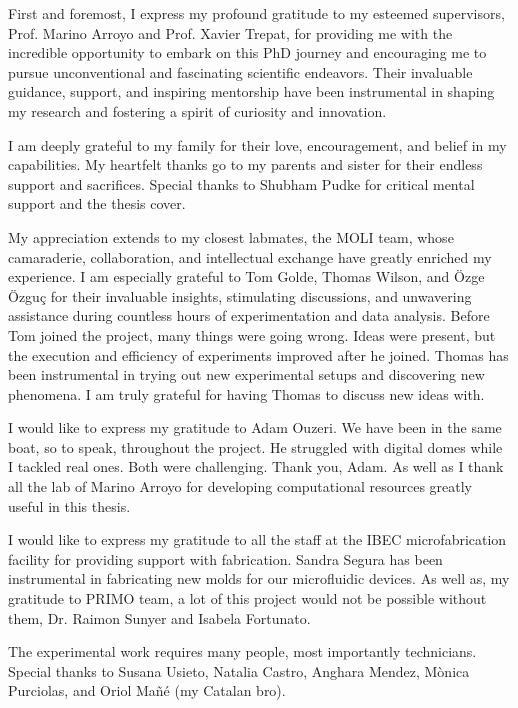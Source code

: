 \begin{Acknowledgements}
	First and foremost, I express my profound gratitude to my esteemed supervisors, Prof. Marino Arroyo and Prof. Xavier Trepat, for providing me with the incredible opportunity to embark on this PhD journey and encouraging me to pursue unconventional and fascinating scientific endeavors. Their invaluable guidance, support, and inspiring mentorship have been instrumental in shaping my research and fostering a spirit of curiosity and innovation.
	
	I am deeply grateful to my family for their love, encouragement, and belief in my capabilities. My heartfelt thanks go to my parents and sister for their endless support and sacrifices. Special thanks to Shubham Pudke for critical mental support and the thesis cover.
	
	My appreciation extends to my closest labmates, the MOLI team, whose camaraderie, collaboration, and intellectual exchange have greatly enriched my experience. I am especially grateful to Tom Golde, Thomas Wilson, and Özge Özguç for their invaluable insights, stimulating discussions, and unwavering assistance during countless hours of experimentation and data analysis. Before Tom joined the project, many things were going wrong. Ideas were present, but the execution and efficiency of experiments improved after he joined. Thomas has been instrumental in trying out new experimental setups and discovering new phenomena. I am truly grateful for having Thomas to discuss new ideas with.
	
	I would like to express my gratitude to Adam Ouzeri. We have been in the same boat, so to speak, throughout the project. He struggled with digital domes while I tackled real ones. Both were challenging. Thank you, Adam. As well as I thank all the lab of Marino Arroyo for developing  computational resources greatly useful in this thesis.
	
	I would like to express my gratitude to all the staff at the IBEC microfabrication facility for providing support with fabrication. Sandra Segura has been instrumental in fabricating new molds for our microfluidic devices. As well as, my gratitude to PRIMO team, a lot of this project would not be possible without them, Dr. Raimon Sunyer and Isabela Fortunato.
	
	The experimental work requires many people, most importantly technicians. Special thanks to Susana Usieto, Natalia Castro, Anghara Mendez, Mònica Purciolas, and Oriol Mañé (my Catalan bro).
	

\end{Acknowledgements}
